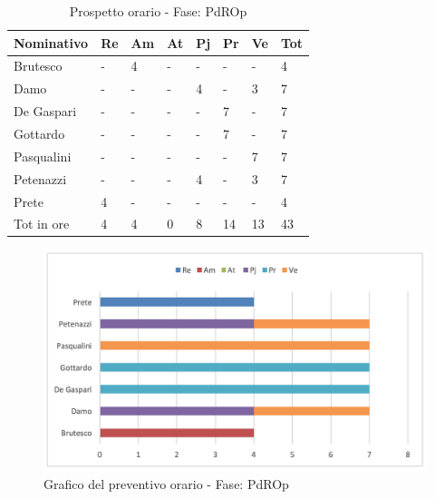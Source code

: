 							\begin{table}[H] \begin{center} \begin{tabular}{llllllll}
							\toprule
							\textbf{Nominativo}	&	\textbf{Re}	&	\textbf{Am}	&	\textbf{At}	&	\textbf{Pj}	&	\textbf{Pr}	&	\textbf{Ve}	&	\textbf{Tot}\\
							\midrule
							Brutesco	&	-	&	4	&	-	&	-	&	-	&	-	&	4	 \\
							Damo	&	-	&	-	&	-	&	4	&	-	&	3	&	7	 \\
							De Gaspari	&	-	&	-	&	-	&	-	&	7	&	-	&	7	 \\
							Gottardo	&	-	&	-	&	-	&	-	&	7	&	-	&	7	 \\
							Pasqualini	&	-	&	-	&	-	&	-	&	-	&	7	&	7	 \\
							Petenazzi	&	-	&	-	&	-	&	4	&	-	&	3	&	7	 \\
							Prete	&	4	&	-	&	-	&	-	&	-	&	-	&	4	 \\
							\midrule
							Tot in ore	&	4	&	4	&	0	&	8	&	14	&	13	&	43	 \\



							\bottomrule
							\end{tabular} \end{center} \caption{Prospetto orario - Fase:
							PdROp
							}\label{tab:h_PdROp} \end{table}		\begin{figure}[H]  \centering  \includegraphics[scale=0.42]{img/h_PdROp}
									\caption{Grafico del preventivo orario - Fase: 								PdROp	}  \label{fig:h_PdROp} \end{figure}
